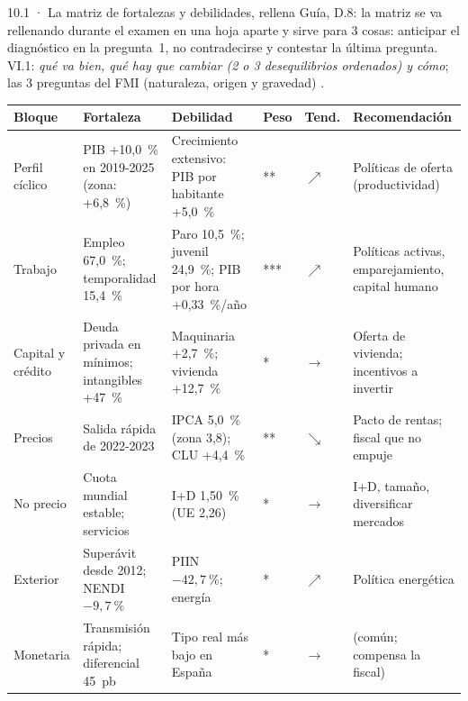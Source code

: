 \begin{complemento}{10.1 · La matriz de fortalezas y debilidades, rellena}
 Guía, D.8: la matriz se va rellenando durante el examen en una hoja aparte y sirve para 3 cosas: anticipar el diagnóstico en la pregunta~1, no contradecirse y contestar la última pregunta. VI.1: \emph{qué va bien, qué hay que cambiar (2 o 3 desequilibrios ordenados) y cómo}; las 3 preguntas del FMI (naturaleza, origen y gravedad) \parencite{FMI2013CaseStudy}.

\begin{tablacaja}
\centering\scriptsize
\renewcommand{\arraystretch}{0.98}\setlength{\tabcolsep}{4pt}
\caption{Matriz de fortalezas y debilidades de España (examen de ejemplo)}\label{tab:matriz-espana}
\begin{tabular}{>{\raggedright\arraybackslash}p{2.0cm}>{\raggedright\arraybackslash}p{3.3cm}>{\raggedright\arraybackslash}p{3.6cm}>{\centering\arraybackslash}p{0.7cm}>{\centering\arraybackslash}p{0.8cm}>{\raggedright\arraybackslash}p{3.4cm}}
\toprule
\rowcolor{tceeazulpalido}
\textbf{Bloque} & \textbf{\textcolor{tceeverde}{Fortaleza}} & \textbf{\textcolor{tceerojo}{Debilidad}} & \textbf{Peso} & \textbf{Tend.} & \textbf{Recomendación} \\
\midrule
Perfil cíclico & PIB +10,0~\% en 2019-2025 (zona: +6,8~\%) & Crecimiento extensivo: PIB por habitante +5,0~\% & ** & $\nearrow$ & Políticas de oferta (productividad) \\
Trabajo & Empleo 67,0~\%; temporalidad 15,4~\% & Paro 10,5~\%; juvenil 24,9~\%; PIB por hora +0,33~\%/año & *** & $\nearrow$ & Políticas activas, emparejamiento, capital humano \\
Capital y crédito & Deuda privada en mínimos; intangibles +47~\% & Maquinaria +2,7~\%; vivienda +12,7~\% & * & $\rightarrow$ & Oferta de vivienda; incentivos a invertir \\
Precios & Salida rápida de 2022-2023 & IPCA 5,0~\% (zona 3,8); CLU +4,4~\% & ** & $\searrow$ & Pacto de rentas; fiscal que no empuje \\
No precio & Cuota mundial estable; servicios & I+D 1,50~\% (UE 2,26) & * & $\rightarrow$ & I+D, tamaño, diversificar mercados \\
Exterior & Superávit desde 2012; NENDI $-9{,}7~\%$ & PIIN $-42{,}7~\%$; energía & * & $\nearrow$ & Política energética \\
Monetaria & Transmisión rápida; diferencial 45~pb & Tipo real más bajo en España & * & $\rightarrow$ & (común; compensa la fiscal) \\

\end{tabular}
\end{tablacaja}
\end{complemento}
